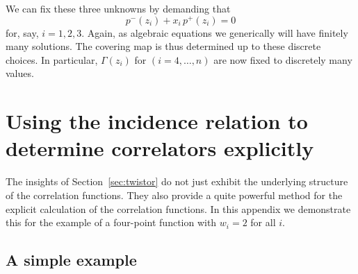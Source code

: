 \documentclass[a4paper,11pt]{article}
\numberwithin{equation}{section}
\begin{document}
We can fix these three unknowns by demanding that 
\begin{equation}
p^-(z_i)+x_i\,p^+(z_i) = 0
\label{eq:gamma-constr-sp}
\end{equation}  
for, say, $i=1,2,3$. Again, as algebraic equations we generically will have finitely 
many solutions. The covering map is thus determined up to these discrete choices. In particular,
$\Gamma(z_i)$ for $(i=4,\ldots, n)$ are now fixed to discretely many values.  

\section{Using the incidence relation to determine correlators explicitly}\label{app:explicit}

The insights of Section~\ref{sec:twistor} do not just exhibit the underlying structure of the correlation functions. They also provide a quite powerful method for the explicit calculation of the correlation functions. In this appendix we demonstrate this for the example of a four-point function with $w_i=2$ for all $i$. 



\subsection{A simple example}
\end{document}
